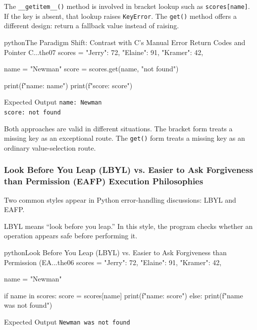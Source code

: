 \documentclass[a4paper,twoside]{report}
\begin{document}
The \texttt{\_\_getitem\_\_()} method is involved in bracket lookup such as \texttt{scores[name]}. If the key is absent, that lookup raises \texttt{KeyError}. The \texttt{get()} method offers a different design: return a fallback value instead of raising.

\begin{codebox}[]{python}{The Paradigm Shift: Contrast with C's Manual Error Return Codes and Pointer C...}{the07}
scores = {
    "Jerry": 72,
    "Elaine": 91,
    "Kramer": 42,
}

name = "Newman"
score = scores.get(name, "not found")

print(f"name: {name}")
print(f"score: {score}")
\end{codebox}


\begin{iobox}{Expected Output}
\texttt{name: Newman} \\
\texttt{score: not found} \\
\end{iobox}


Both approaches are valid in different situations. The bracket form treats a missing key as an exceptional route. The \texttt{get()} form treats a missing key as an ordinary value-selection route.

\subsubsection{Look Before You Leap (LBYL) vs. Easier to Ask Forgiveness than Permission (EAFP) Execution Philosophies}

Two common styles appear in Python error-handling discussions: LBYL and EAFP.

LBYL means ``look before you leap.'' In this style, the program checks whether an operation appears safe before performing it.

\begin{codebox}[]{python}{Look Before You Leap (LBYL) vs. Easier to Ask Forgiveness than Permission (EA...}{the06}
scores = {
    "Jerry": 72,
    "Elaine": 91,
    "Kramer": 42,
}

name = "Newman"

if name in scores:
    score = scores[name]
    print(f"{name}: {score}")
else:
    print(f"{name} was not found")
\end{codebox}


\begin{iobox}{Expected Output}
\texttt{Newman was not found} \\
\end{iobox}
\end{document}
